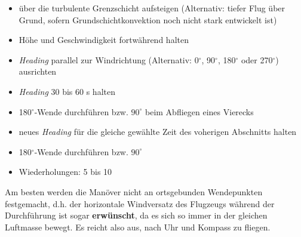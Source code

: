\documentclass[a4paper]{article} %
\begin{document}
\begin{itemize}
	\item über die turbulente Grenzschicht aufsteigen (Alternativ: tiefer Flug über Grund, sofern Grundschichtkonvektion noch nicht stark entwickelt ist)
	\item Höhe und Geschwindigkeit fortwährend halten
	\item \textit{Heading} parallel zur Windrichtung (Alternativ: 0$^\circ$, 90$^\circ$, 180$^\circ$ oder 270$^\circ$) ausrichten
	\item \textit{Heading} 30 bis 60 s halten
	\item 180$^{\circ}$-Wende durchführen bzw. $90^\circ$ beim Abfliegen eines Vierecks
	\item neues \textit{Heading} für die gleiche gewählte Zeit des voherigen Abschnitts halten
	\item 180$^{\circ}$-Wende durchführen bzw. $90^\circ$
	\item Wiederholungen: 5 bis 10
\end{itemize}

Am besten werden die Manöver nicht an ortsgebunden Wendepunkten festgemacht, d.h. der horizontale Windversatz des Flugzeugs während der Durchführung ist sogar \textbf{erwünscht}, da es sich so immer in der gleichen Luftmasse bewegt. Es reicht also aus, nach Uhr und Kompass zu fliegen.
\end{document}
